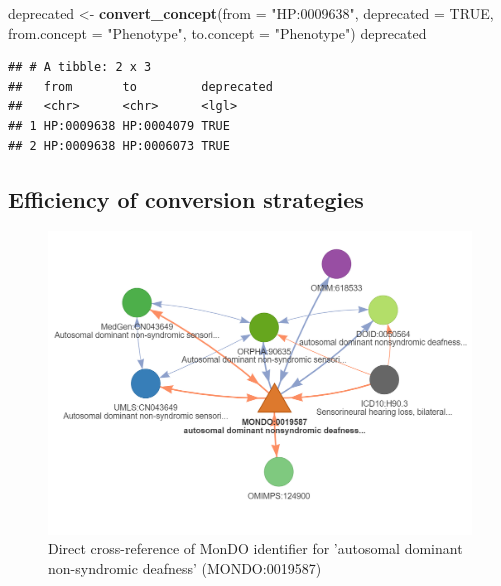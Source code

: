 \documentclass[9pt,a4paper,]{extarticle}
\newenvironment{Shaded}{\begin{snugshade}}{\end{snugshade}}
\newcommand{\DataTypeTok}[1]{\textcolor[rgb]{0.13,0.29,0.53}{#1}}
\newcommand{\KeywordTok}[1]{\textcolor[rgb]{0.13,0.29,0.53}{\textbf{#1}}}
\newcommand{\NormalTok}[1]{#1}
\newcommand{\OtherTok}[1]{\textcolor[rgb]{0.56,0.35,0.01}{#1}}
\newcommand{\StringTok}[1]{\textcolor[rgb]{0.31,0.60,0.02}{#1}}
\begin{document}
\begin{Shaded}
\begin{Highlighting}[]
\NormalTok{deprecated <-}\StringTok{ }\KeywordTok{convert_concept}\NormalTok{(}\DataTypeTok{from =} \StringTok{"HP:0009638"}\NormalTok{,}
                               \DataTypeTok{deprecated =} \OtherTok{TRUE}\NormalTok{,}
                               \DataTypeTok{from.concept =} \StringTok{"Phenotype"}\NormalTok{,}
                               \DataTypeTok{to.concept =} \StringTok{"Phenotype"}\NormalTok{) }
\NormalTok{deprecated}
\end{Highlighting}
\end{Shaded}

\begin{verbatim}
## # A tibble: 2 x 3
##   from       to         deprecated
##   <chr>      <chr>      <lgl>     
## 1 HP:0009638 HP:0004079 TRUE      
## 2 HP:0009638 HP:0006073 TRUE
\end{verbatim}

\hypertarget{efficiency-of-conversion-strategies}{%
\subsection{Efficiency of conversion strategies}\label{efficiency-of-conversion-strategies}}

\begin{figure}

{\centering \includegraphics[width=1\linewidth]{DODO-F1000-publication_files/figure-latex/Figure9} 

}

\caption{Direct cross-reference of MonDO identifier for 'autosomal dominant non-syndromic deafness' (MONDO:0019587)}\label{fig:effConversion}
\end{figure}
\end{document}
